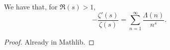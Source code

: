 \begin{theorem}[LogDerivativeDirichlet]
\label{LogDerivativeDirichlet}
\leanok
We have that, for $\Re(s)>1$,
  $$-\frac{\zeta'(s)}{\zeta(s)} = \sum_{n=1}^\infty \frac{\Lambda(n)}{n^s}. $$
\end{theorem}
\begin{proof}
\leanok
Already in Mathlib.
\end{proof}
